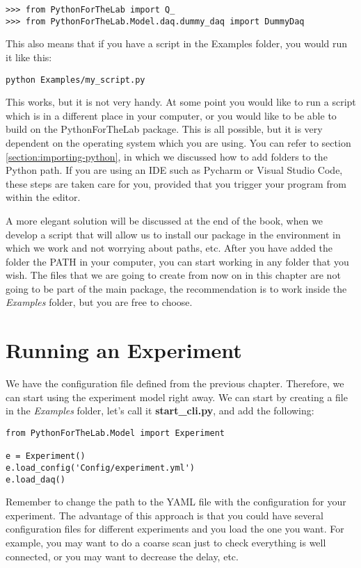 \begin{verbatim}
>>> from PythonForTheLab import Q_
>>> from PythonForTheLab.Model.daq.dummy_daq import DummyDaq
\end{verbatim}

This also means that if you have a script in the Examples folder, you would run it like this:

\begin{verbatim}
python Examples/my_script.py
\end{verbatim}

This works, but it is not very handy. At some point you would like to run a script which is in a different place in your computer, or you would like to be able to build on the PythonForTheLab package. This is all possible, but it is very dependent on the operating system which you are using. You can refer to section \ref{section:importing-python}, in which we discussed how to add folders to the Python path. If you are using an IDE such as Pycharm or Visual Studio Code, these steps are taken care for you, provided that you trigger your program from within the editor. 

A more elegant solution will be discussed at the end of the book, when we develop a  script that will allow us to install our package in the environment in which we work and not worrying about paths, etc. After you have added the folder the {PATH} in your computer, you can start working in any folder that you wish. The files that we are going to create from now on in this chapter are not going to be part of the main package, the recommendation is to work inside the \emph{Examples} folder, but you are free to choose. 

\section{Running an Experiment}\label{running-anexperiment}
We have the configuration file defined from the previous chapter. Therefore, we can start using the experiment model right away. We can start by creating a file in the \emph{Examples} folder, let's call it \textbf{start\_cli.py}, and add the following:

\begin{verbatim}
from PythonForTheLab.Model import Experiment

e = Experiment()
e.load_config('Config/experiment.yml')
e.load_daq()
\end{verbatim}

Remember to change the path to the {YAML} file with the configuration for your experiment. The advantage of this approach is that you could have several configuration files for different experiments and you load the one you want. For example, you may want to do a coarse scan just to check everything is well connected, or you may want to decrease the delay, etc. 


